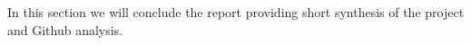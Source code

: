 \documentclass[main.tex]{subfiles}
\begin{document}
In this section we will conclude the report providing short synthesis of the project and Github analysis.\\
\newpage
\end{document}
